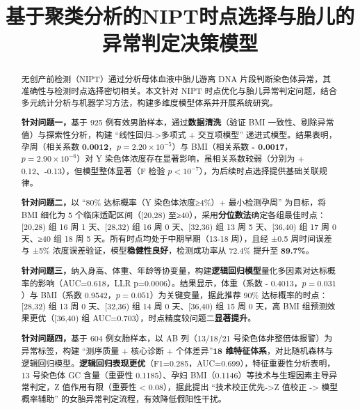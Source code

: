 \documentclass[withoutpreface,bwprint]{cumcmthesis} %
\title{基于聚类分析的NIPT时点选择与胎儿的异常判定决策模型}
\begin{document}
\maketitle
\nocite{*}


\begin{abstract}
无创产前检测（NIPT）通过分析母体血液中胎儿游离 DNA 片段判断染色体异常，其准确性与检测时点选择密切相关。本文针对 NIPT 时点优化与胎儿异常判定问题，结合多元统计分析与机器学习方法，构建多维度模型体系并开展系统研究。

    \textbf{针对问题一，}基于 925 例有效男胎样本，通过\textbf{数据清洗}（验证 BMI 一致性、剔除异常值）与探索性分析，构建 “线性回归->多项式 + 交互项模型” 递进式模型。结果表明，孕周（相关系数 \textbf{0.0012}，$p=2.20×10^{-5}$）与 BMI（相关系数 \textbf{- 0.0017}，$p=2.90×10^{-6}$）对 Y 染色体浓度存在\textbf{}{显著影响}，虽相关系数较弱（分别为 + 0.12、-0.13），但模型整体显著（F 检验 $p<10^{-7}$），为后续时点选择提供基础关联规律。

    \textbf{针对问题二，}以 “80\% 达标概率（Y 染色体浓度≥4\%）+ 最小检测孕周” 为目标，将 BMI 细化为 5 个临床适配区间（[20,28) 至≥40），采用\textbf{分位数法}确定各组最佳时点：[20,28) 组 16 周 1 天、[28,32) 组 16 周 0 天、[32,36) 组 13 周 5 天、[36,40) 组 17 周 0 天、≥40 组 18 周 5 天。所有时点均处于中期早期（13-18 周），且经 ±0.5 周时间误差与 ±5\% 浓度误差验证，模型\textbf{稳健性良好}，检测成功率从 72.4\% 提升至 \textbf{89.7\%}。

    \textbf{针对问题三，}纳入身高、体重、年龄等协变量，构建\textbf{逻辑回归模型}量化多因素对达标概率的影响（AUC=0.618，LLR p=0.0006）。结果显示，体重（系数 - 0.4013，$p=0.031$）与 BMI（系数 0.9542，$p=0.051$）为关键变量，据此推荐 90\% 达标概率的时点：[28,32) 组 13 周 0 天、[32,36) 组 14 周 0 天、[36,40) 组 15 周 0 天，高 BMI 组预测效果更优（[36,40) 组 AUC=0.703），时点精度较问题二\textbf{显著提升}。

    \textbf{针对问题四，}基于 604 例女胎样本，以 AB 列（13/18/21 号染色体非整倍体报警）为异常标签，构建 “测序质量 + 核心诊断 + 个体差异”\textbf{18 维特征体系}，对比随机森林与逻辑回归模型。\textbf{逻辑回归表现更优}（F1=0.285，AUC=0.699），特征重要性分析表明，13 号染色体 GC 含量（重要性 0.1185）、孕妇 BMI（0.1146）等技术与生理因素主导异常判定，Z 值作用有限（重要性 < 0.08），据此提出 “技术校正优先->Z 值校正 -> 模型概率辅助” 的女胎异常判定流程，有效降低假阳性干扰。

\end{abstract}
\end{document}

